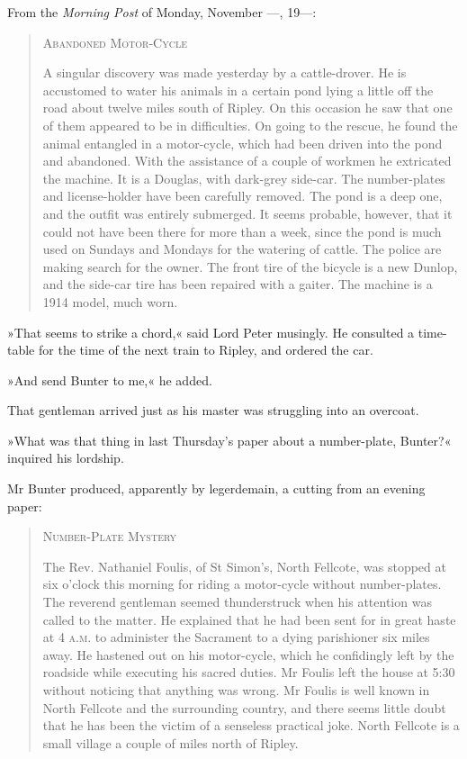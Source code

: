 From the \textit{Morning Post} of Monday, November ---, 19---:
\begin{quote}
\begin{center}
\textsc{Abandoned Motor-Cycle}
\end{center}

A singular discovery was made yesterday by a cattle-drover. He is accustomed to water his animals in a certain pond lying a little off the road about twelve miles south of Ripley. On this occasion he saw that one of them appeared to be in difficulties. On going to the rescue, he found the animal entangled in a motor-cycle, which had been driven into the pond and abandoned. With the assistance of a couple of workmen he extricated the machine. It is a Douglas, with dark-grey side-car. The number-plates and license-holder have been carefully removed. The pond is a deep one, and the outfit was entirely submerged. It seems probable, however, that it could not have been there for more than a week, since the pond is much used on Sundays and Mondays for the watering of cattle. The police are making search for the owner. The front tire of the bicycle is a new Dunlop, and the side-car tire has been repaired with a gaiter. The machine is a 1914 model, much worn.
\end{quote}

»That seems to strike a chord,« said Lord Peter musingly. He consulted a time-table for the time of the next train to Ripley, and ordered the car.

»And send Bunter to me,« he added.

That gentleman arrived just as his master was struggling into an overcoat.

»What was that thing in last Thursday's paper about a number-plate, Bunter?« inquired his lordship.

Mr Bunter produced, apparently by legerdemain, a cutting from an evening paper:

\begin{quote}
\begin{center}
\textsc{Number-Plate Mystery}
\end{center}

The Rev. Nathaniel Foulis, of St Simon's, North Fellcote, was stopped at six o'clock this morning for riding a motor-cycle without number-plates. The reverend gentleman seemed thunderstruck when his attention was called to the matter. He explained that he had been sent for in great haste at 4 \textsc{a.m.} to administer the Sacrament to a dying parishioner six miles away. He hastened out on his motor-cycle, which he confidingly left by the roadside while executing his sacred duties.  Mr Foulis left the house at 5:30 without noticing that anything was wrong. Mr Foulis is well known in North Fellcote and the surrounding country, and there seems little doubt that he has been the victim of a senseless practical joke. North Fellcote is a small village a couple of miles north of Ripley.
\end{quote}

